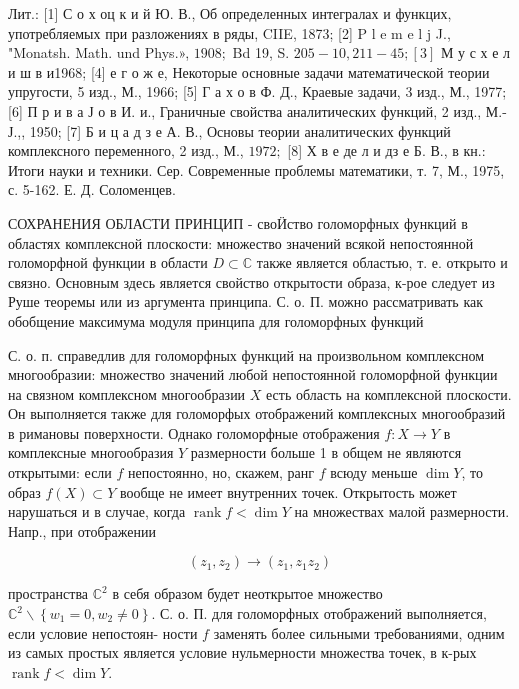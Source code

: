 \documentclass[10pt]{article}
\begin{document}
Лит.: [1] С о х оц к и й Ю. В., Об определенных интегралах и функцих, употребляемых при разложениях в ряды, CIIE, 1873; [2] P l e m e l j J., "Monatsh. Math. und Phys.», $1908 ;$ Bd 19, S. $205-10,211-45 ;[3]$ М у с х е л и ш в и1968; [4] е г о ж е, Некоторые основные задачи математической теории упругости, 5 изд., М., 1966; [5] Г а х о в Ф. Д., Краевые задачи, 3 изд., М., 1977; [6] П р и в а Ј о в И. и., Граничные свойства аналитических функций, 2 изд., М.-Ј.,, 1950; [7] Б и ц а д з е А. В., Основы теории аналитических функций комплексного переменного, 2 изд., М., $1972 ;$ [8] Х в е де л и дз е Б. В., в кн.: Итоги науки и техники. Сер. Современные проблемы математики, т. 7, М., 1975, с. 5-162. Е. Д. Соломенцев.



СОХРАНЕНИЯ ОБЛАСТИ ПРИНЦИП - своӤство голоморфных функций в областях комплексной плоскости: множество значений всякой непостоянной голоморфной функции в области $D \subset \mathbb{C}$ также является областью, т. е. открыто и связно. Основным здесь является свойство открытости образа, к-рое следует из Руше теоремы или из аргумента принципа. С. о. П. можно рассматривать как обобщение максимума модуля принципа для голоморфных функций



С. о. п. справедлив для голоморфных функций на произвольном комплексном многообразии: множество значений любой непостоянной голоморфной функции на связном комплексном многообразии $X$ есть область на комплексной плоскости. Он выполняется также для голоморфых отображений комплексных многообразий в римановы поверхности. Однако голоморфные отображения $f: X \rightarrow Y$ в комплексные многообразия $Y$ размерности больше 1 в общем не являются открытыми: если $f$ непостоянно, но, скажем, ранг $f$ всюду меньше $\operatorname{dim} Y$, то образ $f(X) \subset Y$ вообще не имеет внутренних точек. Открытость может нарушаться и в случае, когда $\operatorname{rank} f<\operatorname{dim} Y$ на множествах малой размерности. Напр., при отображении



\[

\left(z_{1}, z_{2}\right) \longrightarrow\left(z_{1}, z_{1} z_{2}\right)

\]



пространства $\mathbb{C}^{2}$ в себя образом будет неоткрытое множество $\mathbb{C}^{2} \backslash\left\{w_{1}=0, w_{2} \neq 0\right\}$. С. о. П. для голоморфных отображений выполняется, если условие непостоян- ности $f$ заменять более сильными требованиями, одним из самых простых является условие нульмерности множества точек, в к-рых $\operatorname{rank} f<\operatorname{dim} Y$.
\end{document}

